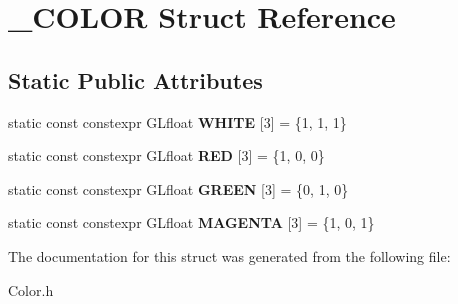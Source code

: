 \hypertarget{struct___c_o_l_o_r}{}\section{\+\_\+\+C\+O\+L\+OR Struct Reference}
\label{struct___c_o_l_o_r}
\subsection*{Static Public Attributes}
\begin{DoxyCompactItemize}
\item 
\mbox{\label{struct___c_o_l_o_r_a965a61b826166803e0c9a37df1a5133e}} 
static const constexpr G\+Lfloat {\bfseries W\+H\+I\+TE} \mbox{[}3\mbox{]} = \{1, 1, 1\}
\item 
\mbox{\label{struct___c_o_l_o_r_af0b83ba40fd51a8cf50ad6e81aee9f04}} 
static const constexpr G\+Lfloat {\bfseries R\+ED} \mbox{[}3\mbox{]} = \{1, 0, 0\}
\item 
\mbox{\label{struct___c_o_l_o_r_a42d106d1592c3357992e5af78254e18f}} 
static const constexpr G\+Lfloat {\bfseries G\+R\+E\+EN} \mbox{[}3\mbox{]} = \{0, 1, 0\}
\item 
\mbox{\label{struct___c_o_l_o_r_aef86b8a9682c989979ac747b5770aa21}} 
static const constexpr G\+Lfloat {\bfseries M\+A\+G\+E\+N\+TA} \mbox{[}3\mbox{]} = \{1, 0, 1\}
\end{DoxyCompactItemize}


The documentation for this struct was generated from the following file\+:\begin{DoxyCompactItemize}
\item 
Color.\+h\end{DoxyCompactItemize}
